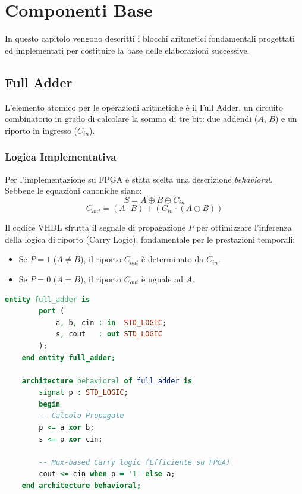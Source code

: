\chapter{Componenti Base}
\label{chap:componenti_base}

In questo capitolo vengono descritti i blocchi aritmetici fondamentali progettati ed implementati per costituire la base delle elaborazioni successive.

\section{Full Adder}
L'elemento atomico per le operazioni aritmetiche è il Full Adder, un circuito combinatorio in grado di calcolare la somma di tre bit: due addendi ($A$, $B$) e un riporto in ingresso ($C_{in}$).



\subsection{Logica Implementativa}
Per l'implementazione su FPGA è stata scelta una descrizione \textit{behavioral}. Sebbene le equazioni canoniche siano:
\begin{equation}
	S = A \oplus B \oplus C_{in}
\end{equation}
\begin{equation}
	C_{out} = (A \cdot B) + (C_{in} \cdot (A \oplus B))
\end{equation}

Il codice VHDL sfrutta il segnale di propagazione $P$ per ottimizzare l'inferenza della logica di riporto (Carry Logic), fondamentale per le prestazioni temporali:
\begin{itemize}
	\item Se $P = 1$ ($A \neq B$), il riporto $C_{out}$ è determinato da $C_{in}$.
	\item Se $P = 0$ ($A = B$), il riporto $C_{out}$ è uguale ad $A$.
\end{itemize}

\begin{lstlisting}[language=VHDL, caption={Entity e Architecture del Full Adder}, label={lst:full_adder}]
	entity full_adder is
		port (
			a, b, cin : in  STD_LOGIC;
			s, cout   : out STD_LOGIC
		);
	end entity full_adder;
	
	architecture behavioral of full_adder is
		signal p : STD_LOGIC;
		begin
		-- Calcolo Propagate
		p <= a xor b;
		s <= p xor cin;
	
		-- Mux-based Carry logic (Efficiente su FPGA)
		cout <= cin when p = '1' else a;
	end architecture behavioral;
\end{lstlisting}

